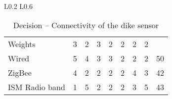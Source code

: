\begin{table}[H]
\begin{tabular}{L{0.2\textwidth} L{0.6\textwidth}}
		\begin{tabular}{l|lllllll|l}
		               & \rot{Reliability} & \rot{Resilience} & \rot{Performance} & \rot{Interoperability} & \rot{Security} & \rot{Scalability} & \rot{Cost} & \rot{\textbf{Score}} \\ \hline
		Weights        & 3 & 2 & 3 & 2 & 2 & 2 & 2 \\ \hline
		Wired          & 5                 & 4                & 3                 & 3                      & 2              & 2                 & 2          & 50                   \\ 
		ZigBee         & 4                 & 2                & 2                 & 2                      & 2              & 4                 & 3          & 42                   \\
		ISM Radio band & 1                 & 5                & 2                 & 2                      & 2              & 3                 & 5          & 43                   \\
	\end{tabular} \\
	\\ \bottomrule
	\end{tabular}
	\caption{Decision -- Connectivity of the dike sensor}
	\label{table:linux}
\end{table}

